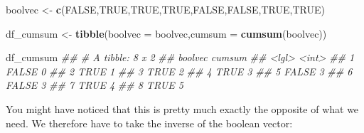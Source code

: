 \documentclass[]{book}
\newenvironment{Shaded}{\begin{snugshade}}{\end{snugshade}}
\newcommand{\CommentTok}[1]{\textcolor[rgb]{0.56,0.35,0.01}{\textit{#1}}}
\newcommand{\DataTypeTok}[1]{\textcolor[rgb]{0.13,0.29,0.53}{#1}}
\newcommand{\KeywordTok}[1]{\textcolor[rgb]{0.13,0.29,0.53}{\textbf{#1}}}
\newcommand{\NormalTok}[1]{#1}
\newcommand{\OperatorTok}[1]{\textcolor[rgb]{0.81,0.36,0.00}{\textbf{#1}}}
\newcommand{\OtherTok}[1]{\textcolor[rgb]{0.56,0.35,0.01}{#1}}
\newcommand{\StringTok}[1]{\textcolor[rgb]{0.31,0.60,0.02}{#1}}
\begin{document}
\begin{Shaded}
\begin{Highlighting}[]

\NormalTok{boolvec <-}\StringTok{ }\KeywordTok{c}\NormalTok{(}\OtherTok{FALSE}\NormalTok{,}\OtherTok{TRUE}\NormalTok{,}\OtherTok{TRUE}\NormalTok{,}\OtherTok{TRUE}\NormalTok{,}\OtherTok{FALSE}\NormalTok{,}\OtherTok{FALSE}\NormalTok{,}\OtherTok{TRUE}\NormalTok{,}\OtherTok{TRUE}\NormalTok{)}

\NormalTok{df_cumsum <-}\StringTok{ }\KeywordTok{tibble}\NormalTok{(}\DataTypeTok{boolvec =}\NormalTok{ boolvec,}\DataTypeTok{cumsum =} \KeywordTok{cumsum}\NormalTok{(boolvec))}

\NormalTok{df_cumsum}
\CommentTok{## # A tibble: 8 x 2}
\CommentTok{##   boolvec cumsum}
\CommentTok{##   <lgl>    <int>}
\CommentTok{## 1 FALSE        0}
\CommentTok{## 2 TRUE         1}
\CommentTok{## 3 TRUE         2}
\CommentTok{## 4 TRUE         3}
\CommentTok{## 5 FALSE        3}
\CommentTok{## 6 FALSE        3}
\CommentTok{## 7 TRUE         4}
\CommentTok{## 8 TRUE         5}
\end{Highlighting}
\end{Shaded}

You might have noticed that this is pretty much exactly the opposite of what we need. We therefore have to take the inverse of the boolean vector:

\begin{Shaded}
\end{Shaded}
\end{document}
